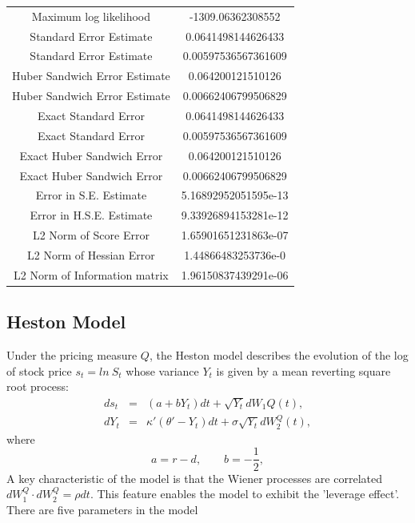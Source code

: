 \documentclass{article}
\newcommand{\be}{\begin{equation}}
\newcommand{\ee}{\end{equation}}
\begin{document}
\begin{table}[h!]
\begin{tabular}{cc}
Maximum log likelihood & -1309.06362308552\\
Standard Error Estimate &  0.0641498144626433\\
Standard Error Estimate  & 0.00597536567361609\\
Huber Sandwich Error Estimate & 0.064200121510126\\
Huber Sandwich Error Estimate   & 0.00662406799506829\\
Exact Standard Error  & 0.0641498144626433\\
Exact Standard Error  & 0.00597536567361609\\
Exact Huber Sandwich Error &  0.064200121510126\\
Exact Huber Sandwich Error & 0.00662406799506829\\
Error in S.E. Estimate & 5.16892952051595e-13\\
Error in H.S.E. Estimate & 9.33926894153281e-12\\
L2 Norm of Score Error & 1.65901651231863e-07\\
L2 Norm of Hessian Error & 1.44866483253736e-0\\
L2 Norm of Information matrix &  1.96150837439291e-06\\
\end{tabular}
\end{table}

\clearpage

%


\subsection{Heston Model}\label{sect:heston}

Under the pricing measure $Q$, the Heston model describes the evolution of the log of stock price $s_t =ln~S_t$ whose variance $Y_t$ is given by a mean reverting square root process:
\begin{eqnarray}
ds_t &=& (a + bY_t)dt  + \sqrt{Y_t}dW_1{Q}(t) ,\\
dY_t &=& \kappa'(\theta' - Y_t)dt  + \sigma \sqrt{Y_t}dW_2^{Q}(t),
\end{eqnarray}
where
\be
a=r-d, \qquad b= -\frac{1}{2},
\ee
A key characteristic of the model is that the Wiener processes are correlated $dW^Q_1\cdot dW_2^Q=\rho dt$. This feature enables the model to exhibit the 'leverage effect'. There are five parameters in the model
\end{document}
